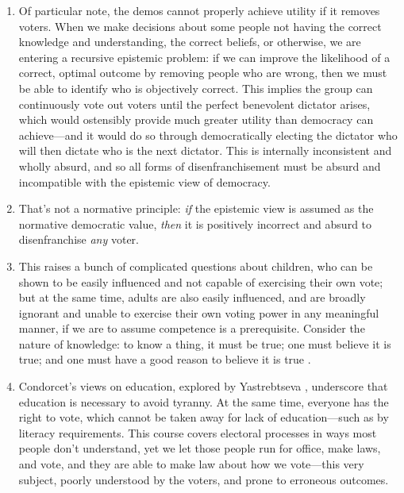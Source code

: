 \begin{enumerate}
\begin{enumerate}
        \item \philosophical Of particular note, the demos cannot properly achieve utility if it removes voters.  When we make decisions about some people not having the correct knowledge and understanding, the correct beliefs, or otherwise, we are entering a recursive epistemic problem:  if we can improve the likelihood of a correct, optimal outcome by removing people who are wrong, then we must be able to identify who is objectively correct.  This implies the group can continuously vote out voters until the perfect benevolent dictator arises, which would ostensibly provide much greater utility than democracy can achieve—and it would do so through democratically electing the dictator who will then dictate who is the next dictator.  This is internally inconsistent and wholly absurd, and so all forms of disenfranchisement must be absurd and incompatible with the epistemic view of democracy.

        \item \philosophical That's not a normative principle:  \textit{if} the epistemic view is assumed as the normative democratic value, \textit{then} it is positively incorrect and absurd to disenfranchise \textit{any} voter.

        \item \philosophical This raises a bunch of complicated questions about children, who can be shown to be easily influenced and not capable of exercising their own vote; but at the same time, adults are also easily influenced, and are broadly ignorant and unable to exercise their own voting power in any meaningful manner, if we are to assume competence is a prerequisite.  Consider the nature of knowledge:  to know a thing, it must be true; one must believe it is true; and one must have a good reason to believe it is true \autocite{Tideman2006}.

        \item \philosophical Condorcet's views on education, explored by Yastrebtseva \autocite{Yastrebtseva2015}, underscore that education is necessary to avoid tyranny.  At the same time, everyone has the right to vote, which cannot be taken away for lack of education—such as by literacy requirements.  This course covers electoral processes in ways most people don't understand, yet we let those people run for office, make laws, and vote, and they are able to make law about how we vote—this very subject, poorly understood by the voters, and prone to erroneous outcomes.
    \end{enumerate}



\end{enumerate}
